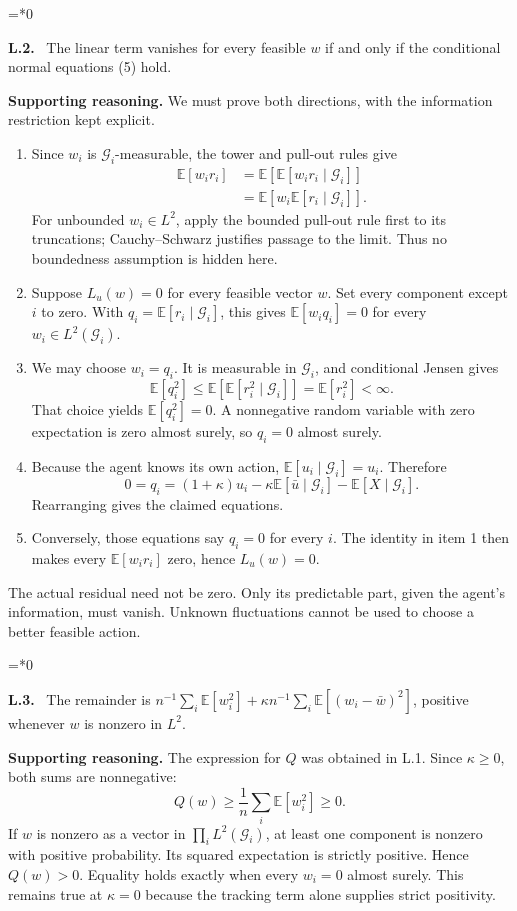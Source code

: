 \documentclass[12pt,letterpaper]{article}
\newcommand{\E}{\mathbb E}
\newcommand{\G}{\mathcal G}
\newenvironment{proofstep}[2]{%
  \begin{list}{}{\leftmargin=\dimexpr 0.17in*#2\relax%
  \setlength{\rightmargin}{0pt}\setlength{\topsep}{5pt}\setlength{\parsep}{2pt}}%
  \item[]\textbf{\textcolor{ink}{#1.}}\ }{\end{list}}
\begin{document}
\begin{proofstep}{L.2}{0}
\label{step:L.2}
The linear term vanishes for every feasible $w$ if and only if the conditional normal equations (5) hold.

\textbf{Supporting reasoning.}
We must prove both directions, with the information restriction kept explicit.
\begin{enumerate}
\item Since $w_i$ is $\G_i$-measurable, the tower and pull-out rules give
\begin{align*}
\E[w_ir_i]&=\E[\E[w_ir_i\mid\G_i]]\\
&=\E[w_i\E[r_i\mid\G_i]].
\end{align*}
For unbounded $w_i\in L^2$, apply the bounded pull-out rule first to its truncations; Cauchy--Schwarz justifies passage to the limit. Thus no boundedness assumption is hidden here.
\item Suppose $L_u(w)=0$ for every feasible vector $w$. Set every component except $i$ to zero. With $q_i=\E[r_i\mid\G_i]$, this gives $\E[w_iq_i]=0$ for every $w_i\in L^2(\G_i)$.
\item We may choose $w_i=q_i$. It is measurable in $\G_i$, and conditional Jensen gives
\[
\E[q_i^2]\le\E[\E[r_i^2\mid\G_i]]=\E[r_i^2]<\infty.
\]
That choice yields $\E[q_i^2]=0$. A nonnegative random variable with zero expectation is zero almost surely, so $q_i=0$ almost surely.
\item Because the agent knows its own action, $\E[u_i\mid\G_i]=u_i$. Therefore
\[
0=q_i=(1+\kappa)u_i-\kappa\E[\bar u\mid\G_i]-\E[X\mid\G_i].
\]
Rearranging gives the claimed equations.
\item Conversely, those equations say $q_i=0$ for every $i$. The identity in item 1 then makes every $\E[w_ir_i]$ zero, hence $L_u(w)=0$.
\end{enumerate}
The actual residual need not be zero. Only its predictable part, given the agent's information, must vanish. Unknown fluctuations cannot be used to choose a better feasible action.
\par{}
\end{proofstep}

\begin{proofstep}{L.3}{0}
\label{step:L.3}
The remainder is $n^{-1}\sum_i\E[w_i^2]+\kappa n^{-1}\sum_i\E[(w_i-\bar w)^2]$, positive whenever $w$ is nonzero in $L^2$.

\textbf{Supporting reasoning.}
The expression for $Q$ was obtained in L.1. Since $\kappa\ge0$, both sums are nonnegative:
\[
Q(w)\ge\frac1n\sum_i\E[w_i^2]\ge0.
\]
If $w$ is nonzero as a vector in $\prod_iL^2(\G_i)$, at least one component is nonzero with positive probability. Its squared expectation is strictly positive. Hence $Q(w)>0$. Equality holds exactly when every $w_i=0$ almost surely. This remains true at $\kappa=0$ because the tracking term alone supplies strict positivity.
\par{}
\end{proofstep}
\end{document}
